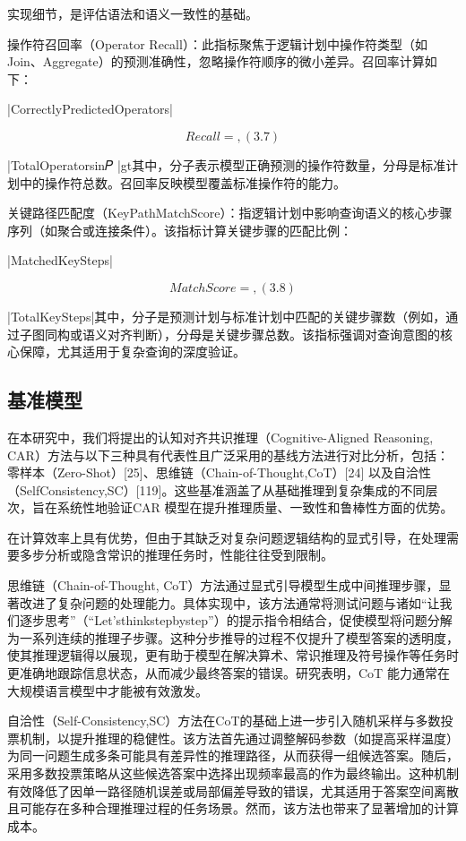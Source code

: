 \documentclass[12pt,a4paper,openright,UTF8]{ctexbook}
\begin{document}
实现细节，是评估语法和语义一致性的基础。


操作符召回率（Operator Recall）：此指标聚焦于逻辑计划中操作符类型（如Join、Aggregate）的预测准确性，忽略操作符顺序的微小差异。召回率计算如下：


|CorrectlyPredictedOperators|

\begin{equation}
Recall = , (3.7)
\end{equation}

|TotalOperatorsin𝑃 |gt其中，分子表示模型正确预测的操作符数量，分母是标准计划中的操作符总数。召回率反映模型覆盖标准操作符的能力。


关键路径匹配度（KeyPathMatchScore）：指逻辑计划中影响查询语义的核心步骤序列（如聚合或连接条件）。该指标计算关键步骤的匹配比例：


|MatchedKeySteps|

\begin{equation}
MatchScore = , (3.8)
\end{equation}

|TotalKeySteps|其中，分子是预测计划与标准计划中匹配的关键步骤数（例如，通过子图同构或语义对齐判断），分母是关键步骤总数。该指标强调对查询意图的核心保障，尤其适用于复杂查询的深度验证。

\subsection{基准模型}

在本研究中，我们将提出的认知对齐共识推理（Cognitive-Aligned Reasoning, CAR）方法与以下三种具有代表性且广泛采用的基线方法进行对比分析，包括：零样本（Zero-Shot）[25]、思维链（Chain-of-Thought,CoT）[24] 以及自洽性（SelfConsistency,SC）[119]。这些基准涵盖了从基础推理到复杂集成的不同层次，旨在系统性地验证CAR 模型在提升推理质量、一致性和鲁棒性方面的优势。


在计算效率上具有优势，但由于其缺乏对复杂问题逻辑结构的显式引导，在处理需要多步分析或隐含常识的推理任务时，性能往往受到限制。


思维链（Chain-of-Thought, CoT）方法通过显式引导模型生成中间推理步骤，显著改进了复杂问题的处理能力。具体实现中，该方法通常将测试问题与诸如“让我们逐步思考”（“Let’sthinkstepbystep”）的提示指令相结合，促使模型将问题分解为一系列连续的推理子步骤。这种分步推导的过程不仅提升了模型答案的透明度，使其推理逻辑得以展现，更有助于模型在解决算术、常识推理及符号操作等任务时更准确地跟踪信息状态，从而减少最终答案的错误。研究表明，CoT 能力通常在大规模语言模型中才能被有效激发。


自洽性（Self-Consistency,SC）方法在CoT的基础上进一步引入随机采样与多数投票机制，以提升推理的稳健性。该方法首先通过调整解码参数（如提高采样温度）为同一问题生成多条可能具有差异性的推理路径，从而获得一组候选答案。随后，采用多数投票策略从这些候选答案中选择出现频率最高的作为最终输出。这种机制有效降低了因单一路径随机误差或局部偏差导致的错误，尤其适用于答案空间离散且可能存在多种合理推理过程的任务场景。然而，该方法也带来了显著增加的计算成本。
\end{document}
